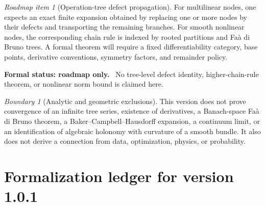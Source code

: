 \documentclass[11pt]{article}
\theoremstyle{definition}
\theoremstyle{remark}
\newtheorem{boundary}[theorem]{Boundary}
\newtheorem{roadmap}[theorem]{Roadmap item}
\newcommand{\statusroadmap}[1]{%
  \par\smallskip\noindent
  {\color{roadmapgray}\textbf{Formal status: roadmap only.}}
  \ #1\par\smallskip}
\begin{document}
\begin{roadmap}[Operation-tree defect propagation]
\label{roadmap:tree-defect}
For multilinear nodes, one expects an exact finite expansion obtained by
replacing one or more nodes by their defects and transporting the remaining
branches.  For smooth nonlinear nodes, the corresponding chain rule is
indexed by rooted partitions and Fa\`a di Bruno trees.  A formal theorem will
require a fixed differentiability category, base points, derivative
conventions, symmetry factors, and remainder policy.
\end{roadmap}
\statusroadmap{No tree-level defect identity, higher-chain-rule theorem, or nonlinear norm bound is claimed here.}

\begin{boundary}[Analytic and geometric exclusions]
This version does not prove convergence of an infinite tree series, existence
of derivatives, a Banach-space Fa\`a di Bruno theorem, a Baker--Campbell--Hausdorff
expansion, a continuum limit, or an identification of algebraic holonomy with
curvature of a smooth bundle.  It also does not derive a connection from
data, optimization, physics, or probability.
\end{boundary}

\section{Formalization ledger for version 1.0.1}
\label{sec:ledger}
\end{document}
